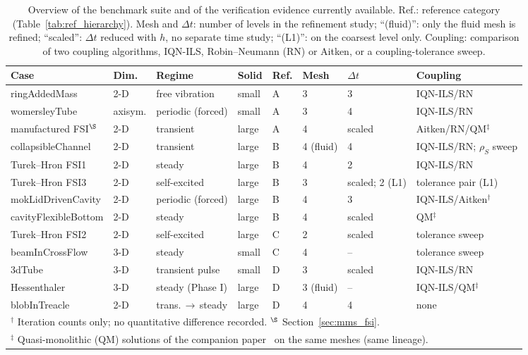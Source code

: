 \begin{table}[htbp]
	\centering
	\footnotesize
	\setlength{\tabcolsep}{3pt}
	\caption{Overview of the benchmark suite and of the verification evidence currently available. Ref.: reference category (Table~\ref{tab:ref_hierarchy}). Mesh and $\Delta t$: number of levels in the refinement study; ``(fluid)'': only the fluid mesh is refined; ``scaled'': $\Delta t$ reduced with $h$, no separate time study; ``(L1)'': on the coarsest level only. Coupling: comparison of two coupling algorithms, IQN-ILS, Robin--Neumann (RN) or Aitken, or a coupling-tolerance sweep.}
	\label{tab:suite_overview}
	\begin{tabular}{llllllll}
		\toprule
		Case & Dim. & Regime & Solid & Ref. & Mesh & $\Delta t$ & Coupling \\
		\midrule
		ringAddedMass & 2-D & free vibration & small & A & 3 & 3 & IQN-ILS/RN \\
		womersleyTube & axisym. & periodic (forced) & small & A & 3 & 4 & IQN-ILS/RN \\
		manufactured FSI$^\S$ & 2-D & transient & large & A & 4 & scaled & Aitken/RN/QM$^\ddagger$ \\
		collapsibleChannel & 2-D & transient & large & B & 4 (fluid) & 4 & IQN-ILS/RN; $\rho_S$ sweep \\
		Turek--Hron FSI1 & 2-D & steady & large & B & 4 & 2 & IQN-ILS/RN \\
		Turek--Hron FSI3 & 2-D & self-excited & large & B & 3 & scaled; 2 (L1) & tolerance pair (L1) \\
		mokLidDrivenCavity & 2-D & periodic (forced) & large & B & 4 & 3 & IQN-ILS/Aitken$^\dagger$ \\
		cavityFlexibleBottom & 2-D & steady & large & B & 4 & scaled & QM$^\ddagger$ \\
		Turek--Hron FSI2 & 2-D & self-excited & large & C & 2 & scaled & tolerance sweep \\
		beamInCrossFlow & 3-D & steady & small & C & 4 & -- & tolerance sweep \\
		3dTube & 3-D & transient pulse & small & D & 3 & scaled & IQN-ILS/RN \\
		Hessenthaler & 3-D & steady (Phase I) & large & D & 3 (fluid) & -- & IQN-ILS/QM$^\ddagger$ \\
		blobInTreacle & 2-D & trans.\,$\to$\,steady & large & D & 4 & 4 & none \\
		\bottomrule
		\multicolumn{8}{l}{$^\dagger$ Iteration counts only; no quantitative difference recorded. $^\S$ Section~\ref{sec:mms_fsi}.} \\
		\multicolumn{8}{l}{$^\ddagger$ Quasi-monolithic (QM) solutions of the companion paper~\citep{CardiffBatistic2026QM} on the same meshes (same lineage).}
	\end{tabular}
\end{table}

